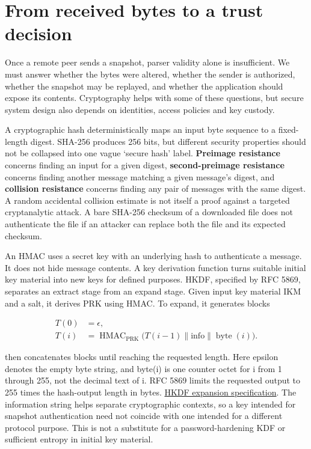 \section{From received bytes to a trust decision}\label{01-foundations-i-ch016-from-received-bytes-to-a-trust-decision}

Once a remote peer sends a snapshot, parser validity alone is insufficient. We must answer whether the bytes were altered, whether the sender is authorized, whether the snapshot may be replayed, and whether the application should expose its contents. Cryptography helps with some of these questions, but secure system design also depends on identities, access policies and key custody.

A cryptographic hash deterministically maps an input byte sequence to a fixed-length digest. SHA-256 produces 256 bits, but different security properties should not be collapsed into one vague `secure hash' label. \textbf{Preimage resistance} concerns finding an input for a given digest, \textbf{second-preimage resistance} concerns finding another message matching a given message's digest, and \textbf{collision resistance} concerns finding any pair of messages with the same digest. A random accidental collision estimate is not itself a proof against a targeted cryptanalytic attack. A bare SHA-256 checksum of a downloaded file does not authenticate the file if an attacker can replace both the file and its expected checksum.

An HMAC uses a secret key with an underlying hash to authenticate a message. It does not hide message contents. A key derivation function turns suitable initial key material into new keys for defined purposes. HKDF, specified by RFC 5869, separates an extract stage from an expand stage. Given input key material IKM and a salt, it derives PRK using HMAC. To expand, it generates blocks

\[
\begin{aligned}
T(0)&=\epsilon,\\
T(i)&=\operatorname{HMAC}_{\mathrm{PRK}}
\bigl(T(i-1)\parallel\mathrm{info}\parallel\operatorname{byte}(i)\bigr).
\end{aligned}
\]

then concatenates blocks until reaching the requested length. Here epsilon denotes the empty byte string, and byte(i) is one counter octet for i from 1 through 255, not the decimal text of i. RFC 5869 limits the requested output to 255 times the hash-output length in bytes. \href{https://www.rfc-editor.org/rfc/rfc5869.html\#section-2.3}{HKDF expansion specification}. The information string helps separate cryptographic contexts, so a key intended for snapshot authentication need not coincide with one intended for a different protocol purpose. This is not a substitute for a password-hardening KDF or sufficient entropy in initial key material.

